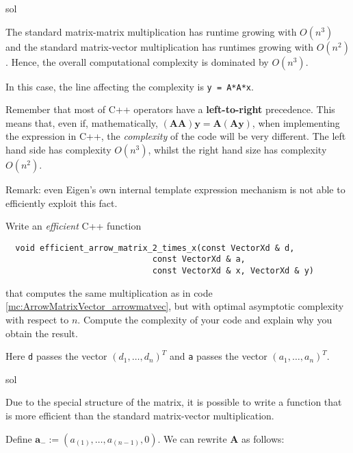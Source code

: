 \begin{samproblem}
\begin{subproblem}{}
 \begin{samwriteprbpart}{sol}
  \begin{samsolution}
  The standard matrix-matrix multiplication has runtime growing with $O(n^3)$ and the standard
  matrix-vector multiplication has runtimes growing with $O(n^2)$. Hence, the overall
  computational complexity is dominated by $O(n^3)$.

  In this case, the line affecting the complexity is \verb|y = A*A*x|.

  Remember that most of C++ operators have a \textbf{left-to-right} precedence. This means that,
  even if,
  mathematically, $(\mathbf{A} \mathbf{A}) \mathbf{y} = \mathbf{A} (\mathbf{A} \mathbf{y})$, when
  implementing the expression in C++, the \emph{complexity} of the code will be very different. The left hand
  side has complexity $O(n^3)$, whilst the right hand size has complexity $O(n^2)$.

  Remark: even Eigen's own internal template expression mechanism is not able to efficiently
  exploit this fact.
\end{samsolution}
\end{samwriteprbpart}
\end{subproblem}

\begin{subproblem}{}
Write an \emph{efficient} C++ function
\begin{verbatim}
  void efficient_arrow_matrix_2_times_x(const VectorXd & d,
                              const VectorXd & a,
                              const VectorXd & x, VectorXd & y)
\end{verbatim}
that computes the same multiplication as in code \ref{mc:ArrowMatrixVector_arrowmatvec}, but
with optimal asymptotic complexity with respect to {$n$}. Compute the complexity of your code and
explain why you obtain the result.

Here \texttt{d} passes the vector $(d_{1},\ldots,d_{n})^{T}$ and \texttt{a} passes the
vector $(a_{1},\ldots,a_{n})^{T}$.
 \begin{samwriteprbpart}{sol}
\begin{samsolution}
  Due to the special structure of the matrix, it is possible to write a function that is more efficient
  than the standard matrix-vector multiplication.

  Define $\mathbf{a}_- := (a_{(1)}, \dots, a_{(n-1)}, 0)$.
  We can rewrite $\mathbf{A}$ as follows:


\end{samsolution}
\end{samwriteprbpart}
\end{subproblem}
\end{samproblem}

